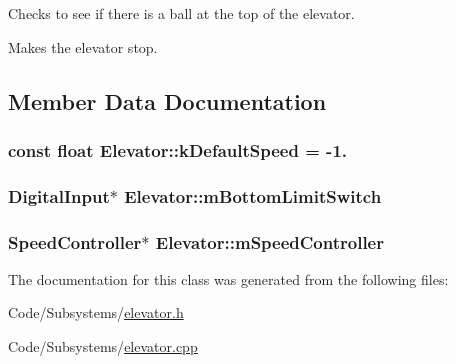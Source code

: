 \-Checks to see if there is a ball at the top of the elevator. 

\-Makes the elevator stop. 

\subsection{\-Member \-Data \-Documentation}
\hypertarget{class_elevator_a846507ceb952e28e67d2924d3760a297}{
\subsubsection[{k\-Default\-Speed}]{\setlength{\rightskip}{0pt plus 5cm}const float {\bf \-Elevator\-::k\-Default\-Speed} = -\/1.}}\label{class_elevator_a846507ceb952e28e67d2924d3760a297}
\hypertarget{class_elevator_af2172b0f50fc8302a990e031613a4550}{
\subsubsection[{m\-Bottom\-Limit\-Switch}]{\setlength{\rightskip}{0pt plus 5cm}\-Digital\-Input$\ast$ {\bf \-Elevator\-::m\-Bottom\-Limit\-Switch}}}\label{class_elevator_af2172b0f50fc8302a990e031613a4550}
\hypertarget{class_elevator_a6d56aabc546f914c00a1c21ef72d2864}{
\subsubsection[{m\-Speed\-Controller}]{\setlength{\rightskip}{0pt plus 5cm}\-Speed\-Controller$\ast$ {\bf \-Elevator\-::m\-Speed\-Controller}}}\label{class_elevator_a6d56aabc546f914c00a1c21ef72d2864}


\-The documentation for this class was generated from the following files\-:\begin{DoxyCompactItemize}
\item 
\-Code/\-Subsystems/\hyperlink{elevator_8h}{elevator.\-h}\item 
\-Code/\-Subsystems/\hyperlink{elevator_8cpp}{elevator.\-cpp}\end{DoxyCompactItemize}
